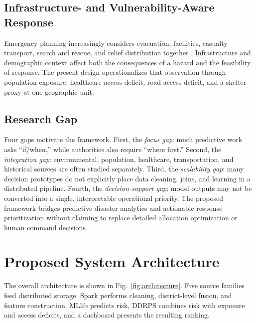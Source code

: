 \documentclass[conference]{IEEEtran}
\begin{document}
\subsection{Infrastructure- and Vulnerability-Aware Response}
Emergency planning increasingly considers evacuation, facilities, casualty
transport, search and rescue, and relief distribution together
\cite{pu}. Infrastructure and demographic context affect both the consequences
of a hazard and the feasibility of response. The present design operationalizes
that observation through population exposure, healthcare access deficit, road
access deficit, and a shelter proxy at one geographic unit.

\subsection{Research Gap}
Four gaps motivate the framework. First, the \emph{focus gap}: much predictive
work asks ``if/when,'' while authorities also require ``where first.'' Second,
the \emph{integration gap}: environmental, population, healthcare,
transportation, and historical sources are often studied separately. Third,
the \emph{scalability gap}: many decision prototypes do not explicitly place
data cleaning, joins, and learning in a distributed pipeline. Fourth, the
\emph{decision-support gap}: model outputs may not be converted into a single,
interpretable operational priority. The proposed framework bridges predictive
disaster analytics and actionable response prioritization without claiming to
replace detailed allocation optimization or human command decisions.

\section{Proposed System Architecture}

The overall architecture is shown in Fig.~\ref{fig:architecture}. Five source
families feed distributed storage. Spark performs cleaning, district-level
fusion, and feature construction. MLlib predicts risk, DDRPS combines risk with
exposure and access deficits, and a dashboard presents the resulting ranking.
\end{document}
